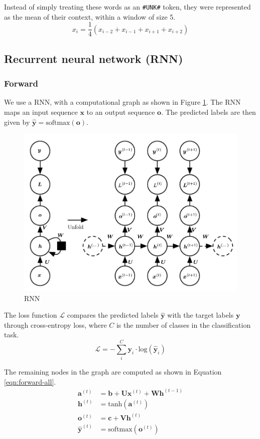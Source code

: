 \documentclass{article}
\numberwithin{equation}{section}
\begin{document}
Instead of simply treating these words as an \lstinline{#UNK#} token, they were represented as the mean of their context, within a window of size 5.
	$$ x_i = \frac{1}{4}(x_{i-2} + x_{i-1} + x_{i+1} + x_{i+2}) $$

\subsection{Recurrent neural network (RNN)}
\subsubsection{Forward}
We use a RNN, with a computational graph as shown in Figure \ref{fig:rnn}. The RNN maps an input sequence $\bm{x}$ to an output sequence $\bm{o}$. The predicted labels are then given by $\hat{\bm{y}} = \text{softmax}(\bm{o})$.\\

\begin{figure}[h!]
	\centering
	\includegraphics[width=0.7\linewidth]{assets/rnn.png}
	\caption{RNN}
	\label{fig:rnn}
\end{figure}

The loss function $\mathcal{L}$ compares the predicted labels $\hat{\bm{y}}$ with the target labels $\bm{y}$ through cross-entropy loss, where $C$ is the number of classes in the classification task.
	$$ \mathcal{L} = -\sum_i^C \bm{y}_i \cdot \text{log}(\hat{\bm{y}}_i) $$

The remaining nodes in the graph are computed as shown in Equation \ref{eqn:forward-all}.
\begin{equation}
\label{eqn:forward-all}
\begin{split}
	\bm{a}^{(t)} &= \bm{b} + \bm{U}\bm{x}^{(t)} + \bm{W}\bm{h}^{(t-1)} \\
	\bm{h}^{(t)} &= \text{tanh}(\bm{a}^{(t)}) \\
	\bm{o}^{(t)} &= \bm{c} + \bm{V}\bm{h}^{(t)} \\
	\hat{\bm{y}}^{(t)} &= \text{softmax}(\bm{o}^{(t)})
\end{split}
\end{equation}
\end{document}
